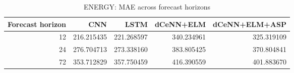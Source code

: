 \begin{table}
\caption{ENERGY: MAE across forecast horizons}
\begin{tabular}{rrrrr}
\toprule
Forecast horizon & CNN & LSTM & dCeNN+ELM & dCeNN+ELM+ASP \\
\midrule
12 & 216.215435 & 221.268597 & 340.234961 & 325.319109 \\
24 & 276.704713 & 273.338160 & 383.805425 & 370.804841 \\
72 & 353.712829 & 357.750459 & 416.390559 & 401.883670 \\
\bottomrule
\end{tabular}
\end{table}
